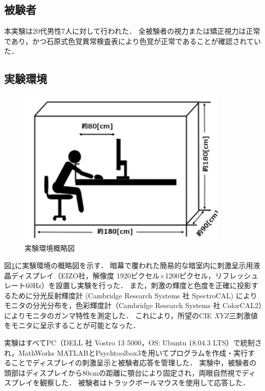        \subsection{被験者}
            本実験は20代男性7人に対して行われた．
            全被験者の視力または矯正視力は正常であり，かつ石原式色覚異常検査表により色覚が正常であることが確認されていた．

        \subsection{実験環境}

            \begin{figure}[h]
                \centering
                \includegraphics[width=10.0cm]{./img/darkroom_p.png}
                \caption{実験環境概略図}
                \label{darkroom}
            \end{figure}
            
            図\ref{darkroom}に実験環境の概略図を示す．
            暗幕で覆われた簡易的な暗室内に刺激呈示用液晶ディスプレイ（EIZO社，解像度 1920ピクセル$\times$1200ピクセル，リフレッシュレート60Hz）を設置し実験を行った．
            また，刺激の輝度と色度を正確に投影するために分光反射輝度計 (Cambridge Research Systems 社 SpectroCAL) によりモニタの分光分布を，色彩輝度計（Cambridge Research Systems 社 ColorCAL2）によりモニタのガンマ特性を測定した．
            これにより，所望のCIE $XYZ$三刺激値をモニタに呈示することが可能となった．
            
            実験はすべてPC（DELL 社 Vostro 13 5000，OS: Ubuntu 18.04.3 LTS）で統制され，MathWorks MATLABとPsychtoolbox3\cite{Psychtoolbox}を用いてプログラムを作成・実行することでディスプレイの刺激呈示と被験者応答を管理した．
            実験中，被験者の頭部はディスプレイから80cmの距離に顎台により固定され，両眼自然視でディスプレイを観察した．
            被験者はトラックボールマウスを使用して応答した．

